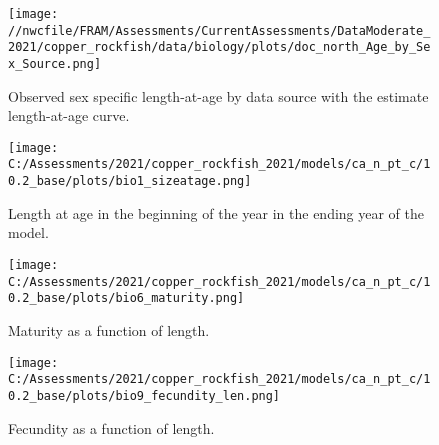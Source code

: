 \documentclass[11pt,
  english,
  a4paper,
]{article}
\begin{document}
\tagmcend\tagstructend


\begin{figure}
\centering
\texttt{[image: //nwcfile/FRAM/Assessments/CurrentAssessments/DataModerate\_2021/copper\_rockfish/data/biology/plots/doc\_north\_Age\_by\_Sex\_Source.png]}
\caption{Observed sex specific length-at-age by data source with the estimate length-at-age curve.\label{fig:len-age-data}}
\end{figure}

\tagmcend\tagstructend


\begin{figure}
\centering
\texttt{[image: C:/Assessments/2021/copper\_rockfish\_2021/models/ca\_n\_pt\_c/10.2\_base/plots/bio1\_sizeatage.png]}
\caption{Length at age in the beginning of the year in the ending year of the model.\label{fig:len-age-ss}}
\end{figure}

\tagmcend\tagstructend

\clearpage


\begin{figure}
\centering
\texttt{[image: C:/Assessments/2021/copper\_rockfish\_2021/models/ca\_n\_pt\_c/10.2\_base/plots/bio6\_maturity.png]}
\caption{Maturity as a function of length.\label{fig:maturity}}
\end{figure}

\tagmcend\tagstructend

\clearpage


\begin{figure}
\centering
\texttt{[image: C:/Assessments/2021/copper\_rockfish\_2021/models/ca\_n\_pt\_c/10.2\_base/plots/bio9\_fecundity\_len.png]}
\caption{Fecundity as a function of length.\label{fig:fecundity}}
\end{figure}
\end{document}
